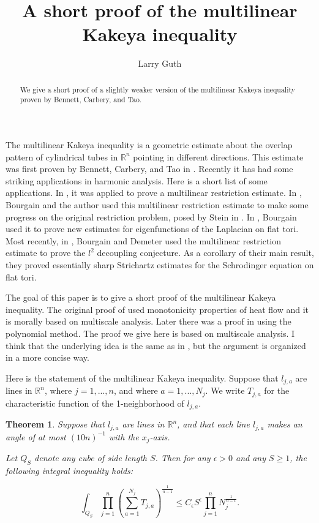 \documentclass{amsart}
\title{A short proof of the multilinear Kakeya inequality}
\author{Larry Guth}
\newtheorem{theorem}[prop]{Theorem}
\newcommand{\eps}{\epsilon}
\newcommand{\RR}{\mathbb{R}}
\begin{document}
\begin{abstract} We give a short proof of a slightly weaker version of the multilinear Kakeya inequality proven by Bennett, Carbery, and Tao.  \end{abstract}

\maketitle

The multilinear Kakeya inequality is a geometric estimate about the overlap pattern of cylindrical tubes in $\RR^n$ pointing in different directions.  This estimate was first proven by Bennett, Carbery, and Tao in \cite{BCT}.  Recently it has had some striking applications in harmonic analysis.  Here is a short list of some applications.  In \cite{BCT}, it was applied to prove a multilinear restriction estimate.  In \cite{BG}, Bourgain and the author used this multilinear restriction estimate to make some progress on the original restriction problem, posed by Stein in \cite{Ste}.   In \cite{B}, Bourgain used it to prove new estimates for eigenfunctions of the Laplacian on flat tori.  Most recently, in \cite{BD}, Bourgain and Demeter used the multilinear restriction estimate to prove the $l^2$ decoupling conjecture.  As a corollary of their main result, they proved essentially sharp Strichartz estimates for the Schrodinger equation on flat tori.

The goal of this paper is to give a short proof of the multilinear Kakeya inequality.  The original proof of \cite{BCT} used monotonicity properties of heat flow and it is morally based on multiscale analysis.  Later there was a proof in \cite{G} using the polynomial method.  The proof we give here is based on multiscale analysis.  I think that the underlying idea is the same as in \cite{BCT}, but the argument is organized in a more concise way.

Here is the statement of the multilinear Kakeya inequality.  Suppose that $l_{j,a}$ are lines in $\RR^n$, where $j = 1, ..., n$, and where $a = 1, ..., N_j$.  We write $T_{j,a}$ for the characteristic function of the 1-neighborhood of $l_{j,a}$.  

\begin{theorem} \label{main} Suppose that $l_{j,a}$ are lines in $\RR^n$, and that each line $l_{j,a}$ makes an angle of at most $(10 n)^{-1}$ with the $x_j$-axis.

Let $Q_S$ denote any cube of side length $S$.  Then for any $\eps > 0$ and any $S \ge 1$, the following integral inequality holds:

\begin{equation} \label{multkak}  \int_{Q_S} \prod_{j=1}^n \left( \sum_{a = 1}^{N_j} T_{j,a} \right)^{\frac{1}{n-1}}  \le C_\eps S^\eps \prod_{j=1}^n N_j^{\frac{1}{n-1}}. \end{equation}
\end{theorem}
\end{document}
